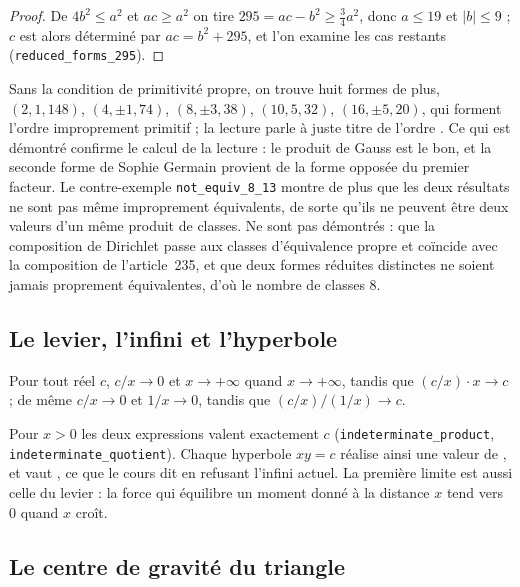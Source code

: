 \begin{proof}
De $4b^2 \leq a^2$ et $ac \geq a^2$ on tire $295 = ac - b^2 \geq \tfrac34 a^2$, donc $a \leq 19$ et $|b| \leq 9$ ; $c$ est alors déterminé par $ac = b^2 + 295$, et l'on examine les cas restants (\texttt{reduced\_forms\_295}).
\end{proof}

\begin{remarque}
Sans la condition de primitivité propre, on trouve huit formes de plus, $(2, 1, 148)$, $(4, \pm 1, 74)$, $(8, \pm 3, 38)$, $(10, 5, 32)$, $(16, \pm 5, 20)$, qui forment l'ordre improprement primitif ; la lecture parle à juste titre de l'ordre . Ce qui est démontré confirme le calcul de la lecture : le produit de Gauss est le bon, et la seconde forme de Sophie Germain provient de la forme opposée du premier facteur. Le contre-exemple \texttt{not\_equiv\_8\_13} montre de plus que les deux résultats ne sont pas même improprement équivalents, de sorte qu'ils ne peuvent être deux valeurs d'un même produit de classes. Ne sont pas démontrés : que la composition de Dirichlet passe aux classes d'équivalence propre et coïncide avec la composition de l'article~235, et que deux formes réduites distinctes ne soient jamais proprement équivalentes, d'où le nombre de classes $8$.
\end{remarque}

\subsection*{Le levier, l'infini et l'hyperbole}

\begin{enonce}
Pour tout réel $c$, $c/x \to 0$ et $x \to +\infty$ quand $x \to +\infty$, tandis que $(c/x) \cdot x \to c$ ; de même $c/x \to 0$ et $1/x \to 0$, tandis que $(c/x)/(1/x) \to c$.
\end{enonce}

Pour $x > 0$ les deux expressions valent exactement $c$ (\texttt{indeterminate\_product}, \texttt{indeterminate\_quotient}). Chaque hyperbole $xy = c$ réalise ainsi une valeur de \q{$0 \times \infty$}, et  vaut , ce que le cours dit en refusant l'infini actuel. La première limite est aussi celle du levier : la force qui équilibre un moment donné à la distance $x$ tend vers $0$ quand $x$ croît.

\subsection*{Le centre de gravité du triangle}

